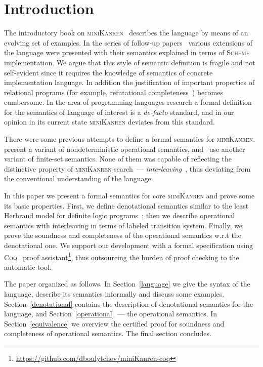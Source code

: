 \section{Introduction}

The introductory book on \textsc{miniKanren}~\cite{TRS} describes the language by means of an evolving set of examples. In the
series of follow-up papers~\cite{MicroKanren,CKanren,CKanren1,AlphaKanren,2016,Guided} various extensions of the language were presented with
their semantics explained in terms of \textsc{Scheme} implementation. We argue that this style of semantic definition is
fragile and not self-evident since it requires the knowledge of semantics of concrete implementation language. In addition the justification of
important properties of relational programs (for example, refutational completeness~\cite{WillThesis}) becomes cumbersome. In the
area of programming languages research a formal definition for the semantics of language of interest is a \emph{de-facto} standard, and
in our opinion in its current state \textsc{miniKanren} deviates from this standard.

There were some previous attempts to define a formal semantics for \textsc{miniKanren}. \citet{RelConversion} present a variant of nondeterministic
operational semantics, and~\citet{DivTest} use another variant of finite-set semantics. None of them was capable of reflecting
the distinctive property of \textsc{miniKanren} search~--- \emph{interleaving}~\cite{Search}, thus deviating from the conventional understanding
of the language.

In this paper we present a formal semantics for core \textsc{miniKanren} and prove some its basic properties. First,
we define denotational semantics similar to the least Herbrand model for definite logic programs~\cite{LHM}; then
we describe operational semantics with interleaving in terms of labeled transition system. Finally, we prove the soundness and
completeness of the operational semantics w.r.t the denotational one. We support our development with a formal specification
using \textsc{Coq}~\cite{Coq} proof assistant\footnote{\url{https://github.com/dboulytchev/miniKanren-coq}}, thus outsourcing
the burden of proof checking to the automatic tool. 

The paper organized as follows. In Section~\ref{language} we give the syntax of the language, describe its semantics
informally and discuss some examples. Section~\ref{denotational} contains the description of denotational semantics for
the language, and Section~\ref{operational}~--- the operational semantics. In Section~\ref{equivalence} we overview the
certified proof for soundness and completeness of operational semantics. The final section concludes.
